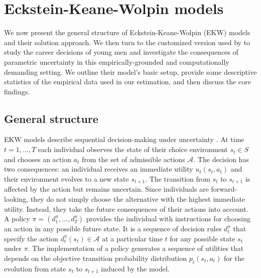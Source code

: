 \FloatBarrier\section{Eckstein-Keane-Wolpin models}\label{Setting}
We now present the general structure of Eckstein-Keane-Wolpin (EKW) models \citep{Aguirregabiria.2010}  and their solution approach. We then turn to the customized version used by \citet{Keane.1997} to study the career decisions of young men and investigate the consequences of parametric uncertainty in this empirically-grounded and computationally demanding setting. We outline their model's basic setup, provide some descriptive statistics of the empirical data used in our estimation, and then discuss the core findings.
\subsection{General structure}
EKW models describe sequential decision-making under uncertainty \citep{Gilboa.2009, Machina.2014}. At time $t = 1, \hdots, T$ each individual observes the state of their choice environment $s_t\in S$ and chooses an action $a_t$ from the set of admissible actions $\mathcal{A}$. The decision has two consequences: an individual receives an immediate utility $u_t(s_t, a_t)$ and their environment evolves to a new state $s_{t + 1}$. The transition from $s_t$ to $s_{t + 1}$ is affected by the action but remains uncertain. Since individuals are forward-looking, they do not simply choose the alternative with the highest immediate utility. Instead, they take the future consequences of their actions into account.\\

\noindent A policy $\pi =(d^\pi_1, \hdots, d^\pi_T)$ provides the individual with instructions for choosing an action in any possible future state. It is a sequence of decision rules $d^\pi_t$ that specify the action $d^\pi_t(s_t) \in \mathcal{A}$   at a particular time $t$ for any possible state $s_t$ under $\pi$. The implementation of a policy generates a sequence of utilities that depends on the objective transition probability distribution $p_t(s_t, a_t)$ for the evolution from state $s_t$ to $s_{t + 1}$ induced by the model.\\

